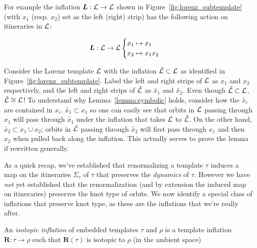 \documentclass[paper.tex]{subfiles}
\begin{document}
For example the inflation $\bm{L} : \mathcal{L} \to \mathcal{L}$ shown in Figure~\ref{fig:lorenz_subtemplate} (with $x_1$ (resp. $x_2$) set as the left (right) strip) has the following action on itineraries in $\mathcal{L}$:

\begin{equation}
\bm{L} : \mathcal{L} \to \mathcal{L}  \begin{cases} x_1 \mapsto x_1 \\ x_2 \mapsto x_1 x_2 \end{cases}
\end{equation}

Consider the Lorenz template $\mathcal{L}$ with the inflation $\tilde{\mathcal{L}} \subset \mathcal{L}$ as identified in Figure~\ref{fig:lorenz_subtemplate}.
Label the left and right strips of $\mathcal{L}$ as $x_1$ and $x_2$ respectively, and the left and right strips of $\tilde{\mathcal{L}}$ as $\tilde{x_1}$ and $\tilde{x_2}$.
Even though $\tilde{\mathcal{L}} \subset \mathcal{L}$, $\tilde{\mathcal{L}} \cong \mathcal{L}$! To understand why Lemma~\ref{lemma:symbolic} holds, consider how the $\tilde{x_i}$ are contained in $x_i$. $\tilde{x_1} \subset x_1$ so one can easily see that
orbits in $\mathcal{L}$ passing through $x_1$ will pass through $\tilde{x_1}$ under the inflation that takes $\mathcal{L}$ to $\tilde{\mathcal{L}}$. On the other hand, $\tilde{x_2} \subset x_1 \cup x_2$; orbits in $\tilde{\mathcal{L}}$ passing through
$\tilde{x_2}$ will first pass through $x_1$ and then $x_2$ when pulled back along the inflation. This actually serves to prove the lemma if rewritten generally.

As a quick recap, we've established that renormalizing a template $\tau$ induces a map on the itineraries $\Sigma_\tau$ of $\tau$ that preserves the \emph{dynamics} of $\tau$. However we have \emph{not} yet established
that the renormalization (and by extension the induced map on itineraries)  preserves the knot type of orbits. We now identify a special class of inflations that preserve knot type, as these are the inflations that we're really after.

\begin{definition}
  An \emph{isotopic inflation} of embedded templates $\tau$ and $\rho$ is a template inflation $\bm{R}: \tau \to \rho$ such that $\bm{R}(\tau)$ is isotopic to $\rho$ (in the ambient space)
\end{definition}
\end{document}
